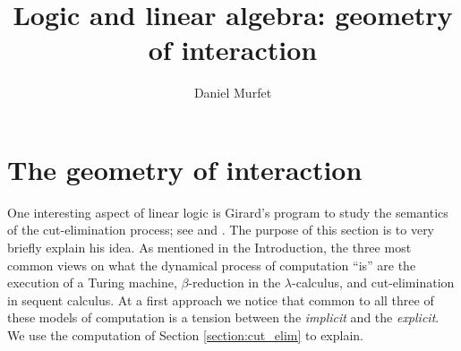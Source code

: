 \documentclass[english,letter paper,12pt,reqno]{article}
\theoremstyle{example}
\numberwithin{equation}{section}
\def\res{\operatorname{Res}}
\begin{document}
\def\ScoreOverhang{1pt}

\def\Res{\res\!}
\newcommand{\ud}[1]{\operatorname{d}\!{#1}}
\newcommand{\Ress}[1]{\res_{#1}\!}
\newcommand{\cat}[1]{\mathcal{#1}}
\newcommand{\lto}{\longrightarrow}
\newcommand{\xlto}[1]{\stackrel{#1}\lto}
\newcommand{\mf}[1]{\mathfrak{#1}}
\newcommand{\md}[1]{\mathscr{#1}}
\newcommand{\church}[1]{\underline{#1}}
\newcommand{\prf}[1]{\underline{#1}}
\newcommand{\den}[1]{\llbracket #1 \rrbracket}
\def\l{\,|\,}
\def\sgn{\textup{sgn}}
\def\cont{\operatorname{cont}}

\title{Logic and linear algebra: geometry of interaction}
\author{Daniel Murfet}

\maketitle

\section{The geometry of interaction}\label{section:goi}

One interesting aspect of linear logic is Girard's program to study the semantics of the cut-elimination process; see \cite[\S III]{girard_towards} and \cite{girard_goi1,girard_goi2,girard_goi3}. The purpose of this section is to very briefly explain his idea. As mentioned in the Introduction, the three most common views on what the dynamical process of computation ``is'' are the execution of a Turing machine, $\beta$-reduction in the $\lambda$-calculus, and cut-elimination in sequent calculus. At a first approach we notice that common to all three of these models of computation is a tension between the \emph{implicit} and the \emph{explicit}. We use the computation of Section \ref{section:cut_elim} to explain. 
\end{document}
